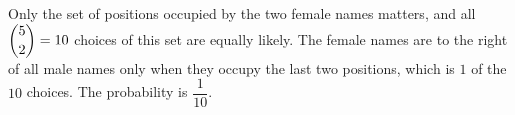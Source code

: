 Only the set of positions occupied by the two female names matters, and all $\dbinom52=10$ choices of this set are equally likely. The female names are to the right of all male names only when they occupy the last two positions, which is $1$ of the $10$ choices. The probability is $\boxed{\dfrac{1}{10}}$.
